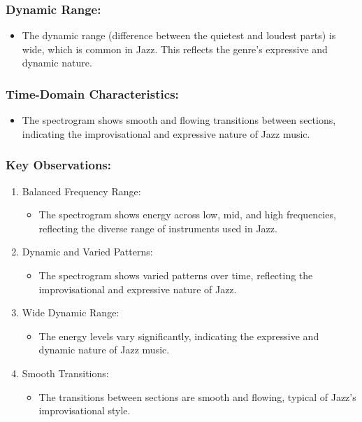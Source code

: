 \documentclass[a4paper,12pt]{article}
\begin{document}
\subsubsection{Dynamic Range:}
\begin{itemize}
    \item The dynamic range (difference between the quietest and loudest parts) is wide, which is common in Jazz. This reflects the genre's expressive and dynamic nature.
\end{itemize}
\subsubsection{Time-Domain Characteristics:}
\begin{itemize}
    \item The spectrogram shows smooth and flowing transitions between sections, indicating the improvisational and expressive nature of Jazz music.
\end{itemize}
\subsubsection{Key Observations:}

\begin{enumerate}
    \item Balanced Frequency Range:
        \begin{itemize}
            \item The spectrogram shows energy across low, mid, and high frequencies, reflecting the diverse range of instruments used in Jazz.  
        \end{itemize}
    \item Dynamic and Varied Patterns:
        \begin{itemize}
            \item The spectrogram shows varied patterns over time, reflecting the improvisational and expressive nature of Jazz. 
        \end{itemize}
    \item Wide Dynamic Range:
        \begin{itemize}
            \item The energy levels vary significantly, indicating the expressive and dynamic nature of Jazz music.   
        \end{itemize}
    \item Smooth Transitions:
        \begin{itemize}
            \item The transitions between sections are smooth and flowing, typical of Jazz's improvisational style.
        \end{itemize}
\end{enumerate}
\newpage
\end{document}
